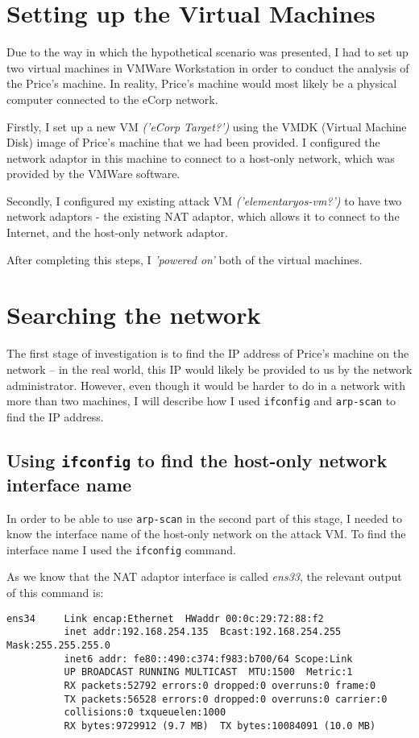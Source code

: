 \documentclass[12pt]{report}
\newcommand{\term}[1]{\colorbox{light-gray}{\texttt{#1}}}
\begin{document}
\section*{Setting up the Virtual Machines}
Due to the way in which the hypothetical scenario was presented, I had to set up two virtual machines in VMWare Workstation in order to conduct the analysis of the Price's machine. In reality, Price's machine would most likely be a physical computer connected to the eCorp network.

Firstly, I set up a new VM \textit{('eCorp Target?')} using the VMDK (Virtual Machine Disk) image of Price's machine that we had been provided. I configured the network adaptor in this machine to connect to a host-only network, which was provided by the VMWare software.

Secondly, I configured my existing attack VM \textit{('elementaryos-vm?')} to have two network adaptors - the existing NAT adaptor, which allows it to connect to the Internet, and the host-only network adaptor.

After completing this steps, I \textit{'powered on'} both of the virtual machines.


\section{Searching the network}
The first stage of investigation is to find the IP address of Price's machine on the network -- in the real world, this IP would likely be provided to us by the network administrator. However, even though it would be harder to do in a network with more than two machines, I will describe how I used \texttt{ifconfig} and \texttt{arp-scan} to find the IP address.

\subsection{Using \texttt{ifconfig} to find the host-only network interface name}
In order to be able to use \texttt{arp-scan} in the second part of this stage, I needed to know the interface name of the host-only network on the attack VM. To find the interface name I used the \term{ifconfig} command.

As we know that the NAT adaptor interface is called \textit{ens33}, the relevant output of this command is:
\begin{Verbatim}
ens34     Link encap:Ethernet  HWaddr 00:0c:29:72:88:f2
          inet addr:192.168.254.135  Bcast:192.168.254.255  Mask:255.255.255.0
          inet6 addr: fe80::490:c374:f983:b700/64 Scope:Link
          UP BROADCAST RUNNING MULTICAST  MTU:1500  Metric:1
          RX packets:52792 errors:0 dropped:0 overruns:0 frame:0
          TX packets:56528 errors:0 dropped:0 overruns:0 carrier:0
          collisions:0 txqueuelen:1000
          RX bytes:9729912 (9.7 MB)  TX bytes:10084091 (10.0 MB)
\end{Verbatim}
\end{document}

